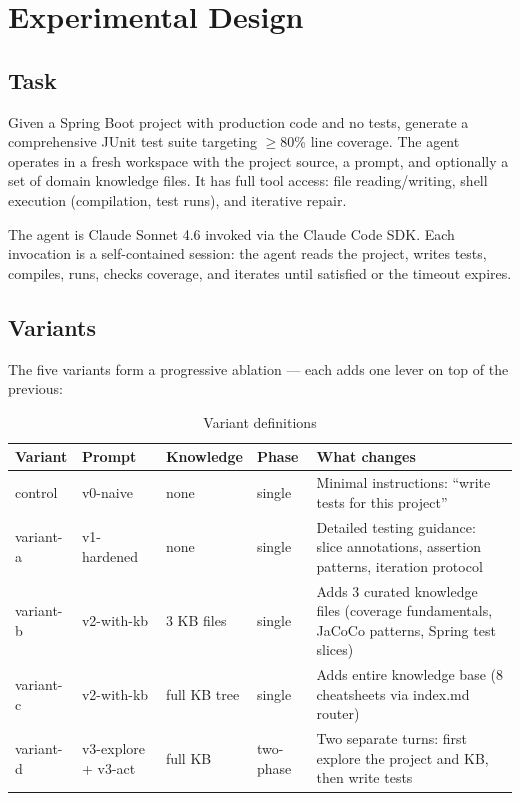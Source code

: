 \documentclass[11pt,a4paper]{article}
\begin{document}


\section{Experimental Design}

\subsection{Task}

Given a Spring Boot project with production code and no tests, generate a
comprehensive JUnit test suite targeting $\geq$80\% line coverage. The agent
operates in a fresh workspace with the project source, a prompt, and optionally
a set of domain knowledge files. It has full tool access: file reading/writing,
shell execution (compilation, test runs), and iterative repair.

The agent is Claude Sonnet 4.6 invoked via the Claude Code SDK. Each invocation
is a self-contained session: the agent reads the project, writes tests, compiles,
runs, checks coverage, and iterates until satisfied or the timeout expires.

\subsection{Variants}

The five variants form a progressive ablation --- each adds one lever on top
of the previous:

\begin{table}[H]
\centering
\caption{Variant definitions}
\label{tab:variants}
\small
\begin{tabular}{@{}llllp{5cm}@{}}
\toprule
\textbf{Variant} & \textbf{Prompt} & \textbf{Knowledge} & \textbf{Phase} & \textbf{What changes} \\
\midrule
control   & v0-naive    & none          & single    & Minimal instructions: ``write tests for this project'' \\
variant-a & v1-hardened & none          & single    & Detailed testing guidance: slice annotations, assertion patterns, iteration protocol \\
variant-b & v2-with-kb  & 3 KB files    & single    & Adds 3 curated knowledge files (coverage fundamentals, JaCoCo patterns, Spring test slices) \\
variant-c & v2-with-kb  & full KB tree  & single    & Adds entire knowledge base (8 cheatsheets via index.md router) \\
variant-d & v3-explore + v3-act & full KB & two-phase & Two separate turns: first explore the project and KB, then write tests \\
\bottomrule
\end{tabular}
\end{table}
\end{document}
